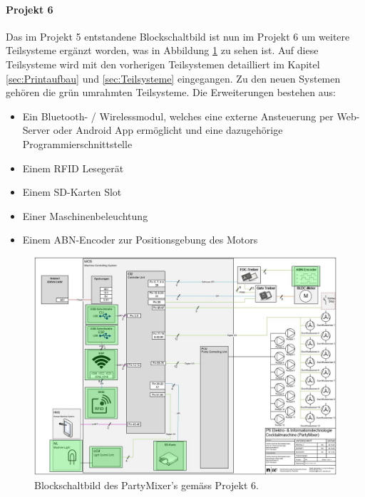\paragraph{Projekt 6}\mbox{}

Das im Projekt 5 entstandene Blockschaltbild ist nun im Projekt 6 um weitere Teilsysteme ergänzt worden, was in Abbildung \ref{fig:Blockschaltbild_Partymixer} zu sehen ist. Auf diese Teilsysteme wird mit den vorherigen Teilsystemen detailliert im Kapitel \ref{sec:Printaufbau} und \ref{sec:Teilsysteme} eingegangen. Zu den neuen Systemen gehören die grün umrahmten Teilsysteme. Die Erweiterungen bestehen aus:

\begin{itemize}
\item Ein Bluetooth- / Wirelessmodul, welches eine externe Ansteuerung per Web-Server oder Android App ermöglicht und eine dazugehörige Programmierschnittstelle 
\item Einem RFID Lesegerät
\item Einem SD-Karten Slot
\item Einer Maschinenbeleuchtung 
\item Einem ABN-Encoder zur Positionsgebung des Motors
\end{itemize}
\mbox{}



\begin{figure}[h!]
\center
\includegraphics[angle=90, width = \textwidth]{graphics/Blockschaltbild}
\caption{Blockschaltbild des PartyMixer's gemäss Projekt 6.}
\label{fig:Blockschaltbild_Partymixer}
\end{figure}

\newpage

